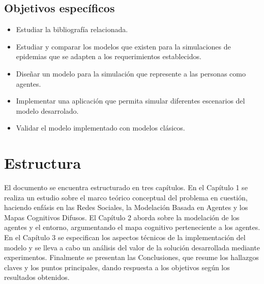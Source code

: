 \subsection{Objetivos específicos}
\begin{itemize}
    \item Estudiar la bibliografía relacionada.
    \item Estudiar y comparar los modelos que existen para la simulaciones de epidemias que se adapten a los requerimientos establecidos.
    \item Diseñar un modelo para la simulación que represente a las personas como agentes.
    \item Implementar una aplicación que permita simular diferentes escenarios del modelo desarrolado.
    \item Validar el modelo implementado con modelos clásicos.
\end{itemize}


\section{Estructura}
El documento se encuentra estructurado en tres capítulos. En el Capítulo 1 
se realiza un estudio sobre el marco teórico conceptual del problema en cuestión, haciendo enfásis en 
las Redes Sociales, la Modelación Basada en Agentes y los Mapas Cognitivos Difusos. El Capítulo 2 aborda sobre
la modelación de los agentes y el entorno, argumentando el mapa cognitivo perteneciente a los agentes. En el 
Capítulo 3 se especifican los aspectos técnicos de la implementación del modelo y se lleva a cabo un 
análisis del valor de la solución desarrollada mediante experimentos. Finalmente se presentan las Conclusiones,
que resume los hallazgos claves y los puntos principales, dando respuesta a los objetivos según los resultados obtenidos.





